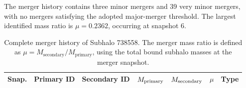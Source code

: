 \documentclass[twocolumn]{openjournal}
\begin{document}
The merger history contains three minor mergers and 39 very minor mergers,
with no mergers satisfying the adopted major-merger threshold. The largest
identified mass ratio is $\mu=0.2362$, occurring at snapshot 6.

\begin{table}[ht]
\centering
\caption{Complete merger history of Subhalo 738558. The merger mass ratio
is defined as $\mu=M_{\mathrm{secondary}}/M_{\mathrm{primary}}$, using the
total bound subhalo masses at the merger snapshot.}
\label{tab:merger_history_738558}
\small
\begin{tabular}{rrrrrrr}
\hline
\textbf{Snap.} &
\textbf{Primary ID} &
\textbf{Secondary ID} &
\textbf{$M_{\rm primary}$} &
\textbf{$M_{\rm secondary}$} &
\textbf{$\mu$} &
\textbf{Type} \\
\hline


\end{tabular}
\end{table}
\end{document}
